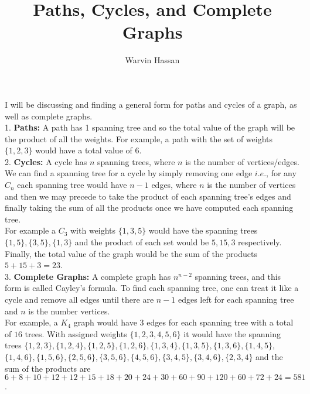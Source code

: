 \documentclass{article}
\title{Paths, Cycles, and Complete Graphs}
\author{Warvin Hassan}
\begin{document}
\maketitle
I will be discussing and finding a general form for paths and cycles of a graph, as well as complete graphs.\\

1. \textbf{Paths:} A path has 1 spanning tree and so the total value of the graph will be the product of all the weights. For example, a path with the set of weights $\{1,2,3\}$ would have a total value of $6$.\\

2. \textbf{Cycles:} A cycle has $n$ spanning trees, where $n$ is the number of vertices/edges. We can find a spanning tree for a cycle by simply removing one edge $i.e.$, for any $C_{n}$ each spanning tree would have $n-1$ edges, where $n$ is the number of vertices and then we may precede to take the product of each spanning tree's edges and finally taking the sum of all the products once we have computed each spanning tree.\\

For example a $C_{3}$ with weights $\{1,3,5\}$ would have the spanning trees $\{1,5\},\{3,5\},\{1,3\}$ and the product of each set would be $5,15,3$ respectively. Finally, the total value of the graph would be the sum of the products $5+15+3=23$.\\

3. \textbf{Complete Graphs:} A complete graph has $n^{n-2}$ spanning trees, and this form is called Cayley's  formula. To find each spanning tree, one can treat it like a cycle and remove all edges until there are $n-1$ edges left for each spanning tree and $n$ is the number vertices. \\

For example, a $K_{4}$ graph would have $3$ edges for each spanning tree with a total of $16$ trees. With assigned weights $\{1,2,3,4,5,6\}$ it would have the spanning trees $\{1,2,3\}, \{1,2,4\}, \{1,2,5\}, \{1,2,6\}, \{1,3,4\}, \{1,3,5\}, \{1,3,6\}, \{1,4,5\},$\\ $\{1,4,6\}, \{1,5,6\}, \{2,5,6\}, \{3,5,6\}, \{4,5,6\}, \{3,4,5\}, \{3,4,6\}, \{2,3,4\}$ and the sum of the products are $6 + 8 + 10 + 12 + 12 + 15 + 18 + 20 + 24 + 30 + 60 + 90 + 120 + 60 + 72 + 24 = 581$.
\end{document}
